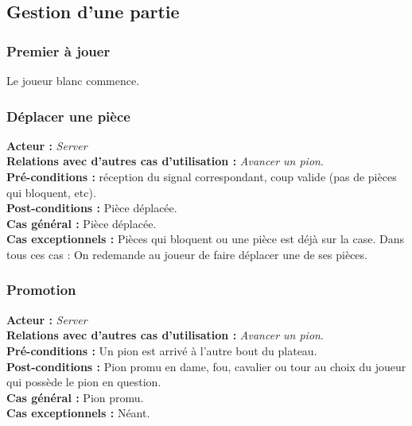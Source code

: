 \documentclass[10pt, a4paper]{article}
\begin{document}
\subsection{Gestion d'une partie}

\subsubsection{Premier à jouer}
Le joueur blanc commence.

\subsubsection{Déplacer une pièce}
\textbf{Acteur :} \textit{Server} \\
\textbf{Relations avec d'autres cas d'utilisation :} {\itshape Avancer un pion}. \\
\textbf{Pré-conditions :} réception du signal correspondant, coup valide (pas de pièces qui bloquent, etc). \\
\textbf{Post-conditions :} Pièce déplacée. \\
\textbf{Cas général :} Pièce déplacée. \\
\textbf{Cas exceptionnels :} Pièces qui bloquent ou une pièce est déjà sur la case. Dans tous ces cas : On redemande au joueur de faire déplacer une de ses pièces. \\

\subsubsection{Promotion}
\textbf{Acteur :} \textit{Server} \\
\textbf{Relations avec d'autres cas d'utilisation :} {\itshape Avancer un pion}. \\
\textbf{Pré-conditions :} Un pion est arrivé à l'autre bout du plateau. \\
\textbf{Post-conditions :} Pion promu en dame, fou, cavalier ou tour au choix du joueur qui possède le pion en question. \\
\textbf{Cas général :} Pion promu. \\
\textbf{Cas exceptionnels :} Néant. \\
\end{document}
